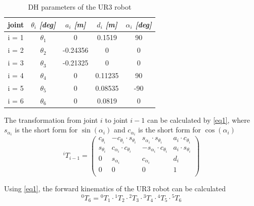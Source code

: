 \begin{table}[htbp]
\caption{DH parameters of the UR3 robot}
\begin{center}
\begin{tabular}{|c|c|c|c|c|}
\hline
\cline{2-5} 
\textbf{joint} & \textbf{\textit{$\theta_{i}$ [deg]}}& \textbf{\textit{$a_{i}$ [m]}}& \textbf{\textit{$d_{i}$ [m]}} & \textbf{\textit{$\alpha_{i}$ [deg]}}\\
\hline
i = 1& $\theta_{1}$& 0& 0.1519& 90 \\
i = 2& $\theta_{2}$& -0.24356& 0& 0 \\
i = 3& $\theta_{3}$& -0.21325& 0& 0 \\
i = 4& $\theta_{4}$& 0& 0.11235& 90 \\
i = 5& $\theta_{5}$& 0& 0.08535& -90 \\
i = 6& $\theta_{6}$& 0& 0.0819& 0 \\
\hline
\end{tabular}
\label{tab1}
\end{center}
\end{table}
The transformation from joint $i$ to joint $i-1$ can be calculated by \eqref{eq1}, where $s_{\alpha_{i}}$ is the short form for $\sin(\alpha_{i})$ and $c_{\alpha_{i}}$ is the short form for $\cos(\alpha_{i})$
\begin{equation}
{}^{i}{T}_{i-1} = \left( \begin{array}{rrrr}                                
c_{\theta_{i}} & -c_{\theta_{i}} \cdot s_{\theta_{i}} & s_{\alpha_{i}} \cdot s_{\theta_{i}} & a_{i} \cdot c_{\theta_{i}} \\                                               
s_{\theta_{i}} & c_{\alpha_{i}} \cdot c_{\theta_{i}} & -s_{\alpha_{i}} \cdot c_{\theta_{i}} &  a_{i} \cdot s_{\theta_{i}} \\                                               
0 & s_{\alpha_{i}} & c_{\alpha_{i}} & d_{i} \\
0 & 0 & 0 & 1 \\                                               
\end{array}\right)
\label{eq1}
\end{equation}

Using \eqref{eq1}, the forward kinematics of the UR3 robot can be calculated 
\begin{equation}
{}^{0}{T}_{6}={}^{0}{T}_{1} \cdot {}^{1}{T}_{2} \cdot {}^{2}{T}_{3} \cdot {}^{3}{T}_{4} \cdot {}^{4}{T}_{5} \cdot {}^{5}{T}_{6}
\label{eq2}
\end{equation}

